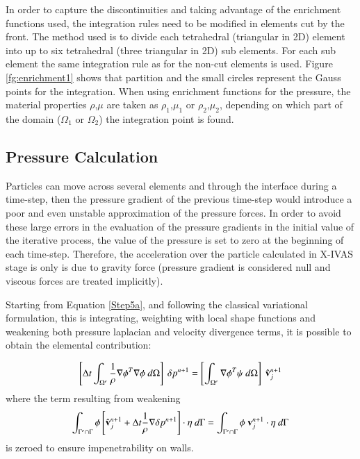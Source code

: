 In order to capture the discontinuities and taking advantage of the enrichment functions used, the integration rules need to be modified in elements cut by the front. The method used is to divide each tetrahedral (triangular in 2D) element into up to six tetrahedral
(three triangular in 2D) sub elements. For each sub element the same integration rule as for the non-cut elements is used. Figure \ref{fg:enrichment1} shows that partition and the small circles represent the Gauss points for the integration. When using enrichment functions for the pressure, the material properties $\rho$,$\mu$ are taken as $\rho_1$,$\mu_1$ or $\rho_2$,$\mu_2$, depending on which part of the domain ($\Omega_1$ or $\Omega_2$) the integration point is found.

   \subsection{Pressure Calculation}

Particles can move across several elements and through the interface during a time-step, then the pressure gradient of the previous time-step would introduce a poor and even unstable approximation of the pressure forces. In order to avoid these large errors in the evaluation of the pressure gradients in the initial value of the iterative process, the value of the pressure is set to zero at the beginning of each time-step. Therefore, the acceleration over the particle calculated in X-IVAS stage is only is due to gravity force (pressure gradient is considered null and viscous forces are treated implicitly)\cite{Idelsohn13c}.

Starting from Equation \ref{Step5a}, and following the classical variational formulation, this is integrating, weighting with local shape functions and weakening both pressure laplacian and velocity divergence terms, it is possible to obtain the elemental contribution:

\begin{equation}
   \left[\Delta t \int_{\Omega^e} \frac{1}{\rho} \nabla \phi^T \nabla \phi \ d\Omega\right]\ \delta p^{n+1} = \left[\int_{\Omega^e} \nabla \phi^T \psi \ d\Omega\right]\ \hat \vv_j^{n+1}
\label{poisson}
\end{equation}
where the term resulting from weakening
\begin{equation}
\displaystyle \int_{\Gamma^e\cap\Gamma} \phi \left[ \hat \vv_j^{n+1} + \Delta t \frac{1}{\rho} \nabla  \delta p^{n+1} \right] \cdot \eta \ d\Gamma = \int_{\Gamma^e\cap\Gamma} \phi \ \vv_j^{n+1} \cdot \eta \ d\Gamma 
\end{equation}
 is zeroed to ensure impenetrability on walls.

